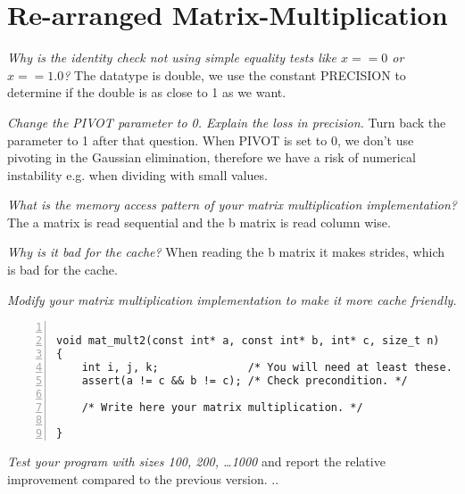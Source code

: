 \documentclass{article}
\begin{document}
\section{Re-arranged Matrix-Multiplication}

\begin{ExerciseList}
\Exercise
{}

\Question
\emph{Why is the identity check not using simple equality tests
  like $x==0$ or $x==1.0$?}
\Answer The datatype is double, we use the constant PRECISION to determine if the double is as close to 1 as we want.

\Question
\emph{Change the PIVOT parameter to 0. Explain the loss in precision.}
Turn back the parameter to 1 after that question.
\Answer When PIVOT is set to 0, we don't use pivoting in the Gaussian elimination, therefore we have a risk of numerical instability e.g. when dividing with
small values.

\Question
\emph{What is the memory access pattern of your matrix multiplication
  implementation?}
\Answer The a matrix is read sequential and the b matrix is read column wise.

\Question
\emph{Why is it bad for the cache?}
\Answer When reading the b matrix it makes strides, which is bad for the cache.

\Question
\emph{Modify your matrix multiplication implementation to make it more
  cache friendly.}

\begin{lstlisting}[basicstyle=\small\sffamily,
keywords={break,case,const,continue,default,else,enum,
for,if,return,switch,while,do,long,void,int,float,double,
char,struct,typedef,include,size\_t},
keywordstyle={\color{blue}},
comment={[l]{//}}, morecomment={[s]{/*}{*/}}, commentstyle=\itshape,
columns={[l]flexible}, numbers=left, numberstyle=\tiny,
frameround=fftt, frame=shadowbox, captionpos=b,
caption={Matrix multiplication function.},
label=LST:MatMulFunc2]

void mat_mult2(const int* a, const int* b, int* c, size_t n)
{
    int i, j, k;              /* You will need at least these. */
    assert(a != c && b != c); /* Check precondition. */

    /* Write here your matrix multiplication. */

}
\end{lstlisting}

\Question
\emph{Test your program with sizes 100, 200, \dots 1000} and report
the relative improvement compared to the previous version.
\Answer .. %
\end{ExerciseList}
\end{document}
